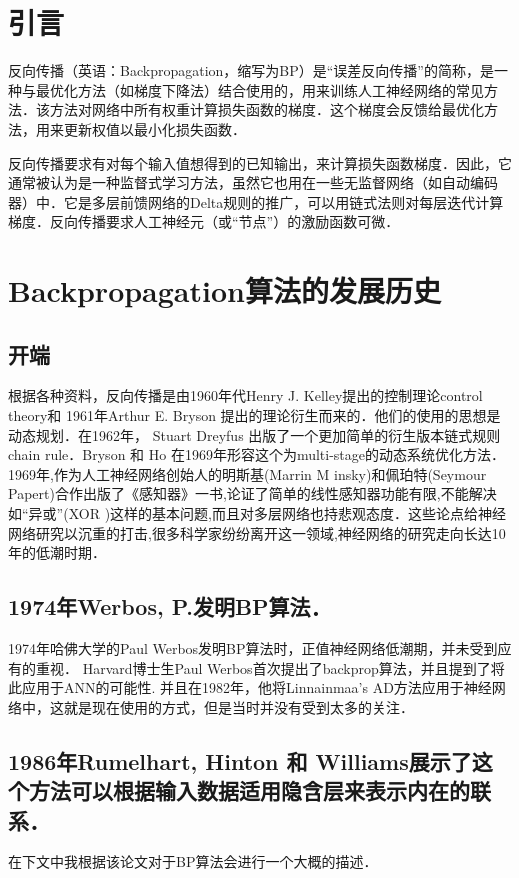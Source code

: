 

\maketitle

\section{引言}
反向传播（英语：Backpropagation，缩写为BP）是“误差反向传播”的简称，是一种与最优化方法（如梯度下降法）结合使用的，用来训练人工神经网络的常见方法．该方法对网络中所有权重计算损失函数的梯度．这个梯度会反馈给最优化方法，用来更新权值以最小化损失函数．

反向传播要求有对每个输入值想得到的已知输出，来计算损失函数梯度．因此，它通常被认为是一种监督式学习方法，虽然它也用在一些无监督网络（如自动编码器）中．它是多层前馈网络的Delta规则的推广，可以用链式法则对每层迭代计算梯度．反向传播要求人工神经元（或“节点”）的激励函数可微．

\section{Backpropagation算法的发展历史}
\subsection{开端}
根据各种资料，反向传播是由1960年代Henry J. Kelley提出的控制理论control theory和 1961年Arthur E. Bryson 提出的理论衍生而来的．他们的使用的思想是动态规划．在1962年， Stuart Dreyfus 出版了一个更加简单的衍生版本链式规则chain rule．Bryson 和 Ho 在1969年形容这个为multi-stage的动态系统优化方法．1969年,作为人工神经网络创始人的明斯基(Marrin M insky)和佩珀特(Seymour Papert)合作出版了《感知器》一书,论证了简单的线性感知器功能有限,不能解决如“异或”(XOR )这样的基本问题,而且对多层网络也持悲观态度．这些论点给神经网络研究以沉重的打击,很多科学家纷纷离开这一领域,神经网络的研究走向长达10年的低潮时期．
\subsection{1974年Werbos, P.发明BP算法．\cite{1}}
1974年哈佛大学的Paul Werbos发明BP算法时，正值神经网络低潮期，并未受到应有的重视．
Harvard博士生Paul Werbos首次提出了backprop算法，并且提到了将此应用于ANN的可能性. 并且在1982年，他将Linnainmaa's AD方法应用于神经网络中，这就是现在使用的方式，但是当时并没有受到太多的关注．

\subsection{1986年Rumelhart, Hinton 和 Williams展示了这个方法可以根据输入数据适用隐含层来表示内在的联系．\cite{2}}
在下文中我根据该论文对于BP算法会进行一个大概的描述．
